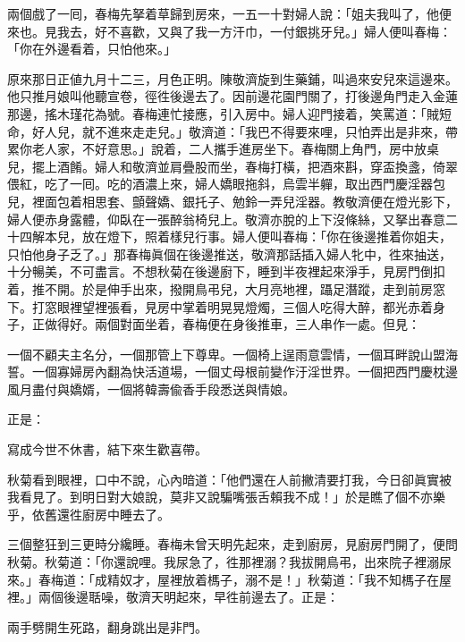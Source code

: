 兩個戲了一囘，春梅先拏着草歸到房來，一五一十對婦人說：「姐夫我叫了，他便來也。見我去，好不喜歡，又與了我一方汗巾，一付銀挑牙兒。」婦人便叫春梅：「你在外邊看着，只怕他來。」

原來那日正値九月十二三，月色正明。陳敬濟旋到生藥鋪，叫過來安兒來這邊來。他只推月娘叫他聽宣卷，徑徃後邊去了。因前邊花園門關了，打後邊角門走入金蓮那邊，搖木瑾花為號。春梅連忙接應，引入房中。婦人迎門接着，笑罵道：「賊短命，好人兒，就不進來走走兒。」敬濟道：「我巴不得要來哩，只怕弄出是非來，帶累你老人家，不好意思。」說着，二人攜手進房坐下。春梅關上角門，房中放桌兒，擺上酒餚。婦人和敬濟並肩疊股而坐，春梅打橫，把酒來斟，穿盃換盞，倚翠偎紅，吃了一囘。吃的酒濃上來，婦人嬌眼拖斜，烏雲半軃，取出西門慶淫器包兒，裡面包着相思套、顫聲嬌、銀托子、勉鈴一弄兒淫器。{}教敬濟便在燈光影下，婦人便赤身露體，仰臥在一張醉翁椅兒上。敬濟亦脫的上下沒條絲，又拏出春意二十四解本兒，放在燈下，照着樣兒行事。婦人便叫春梅：「你在後邊推着你姐夫，只怕他身子乏了。」那春梅眞個在後邊推送，敬濟那話插入婦人牝中，徃來抽送，十分暢美，不可盡言。不想秋菊在後邊廚下，睡到半夜裡起來淨手，見房門倒扣着，推不開。於是伸手出來，撥開鳥弔兒，大月亮地裡，躡足潛蹤，走到前房窓下。打窓眼裡望裡張看，見房中掌着明晃晃燈燭，三個人吃得大醉，都光赤着身子，正做得好。兩個對面坐着，春梅便在身後推車，三人串作一處。{}但見：

\begin{myquote}
一個不顧夫主名分，一個那管上下尊卑。一個椅上逞雨意雲情，一個耳畔說山盟海誓。一個寡婦房內翻為快活道場，一個丈母根前變作汙淫世界。一個把西門慶枕邊風月盡付與嬌婿，一個將韓壽偸香手段悉送與情娘。
\end{myquote}

正是：

\begin{myquote}
寫成今世不休書，結下來生歡喜帶。
\end{myquote}

秋菊看到眼裡，口中不說，心內暗道：「他們還在人前撇清要打我，今日卻眞實被我看見了。到明日對大娘說，莫非又說騙嘴張舌賴我不成！」{}於是瞧了個不亦樂乎，依舊還徃廚房中睡去了。

三個整狂到三更時分纔睡。春梅未曾天明先起來，走到廚房，見廚房門開了，便問秋菊。秋菊道：「你還說哩。我尿急了，徃那裡溺？我拔開鳥弔，出來院子裡溺尿來。」{}春梅道：「成精奴才，屋裡放着榪子，溺不是！」秋菊道：「我不知榪子在屋裡。」兩個後邊聒噪，敬濟天明起來，早徃前邊去了。正是：

\begin{myquote}
兩手劈開生死路，翻身跳出是非門。
\end{myquote}

